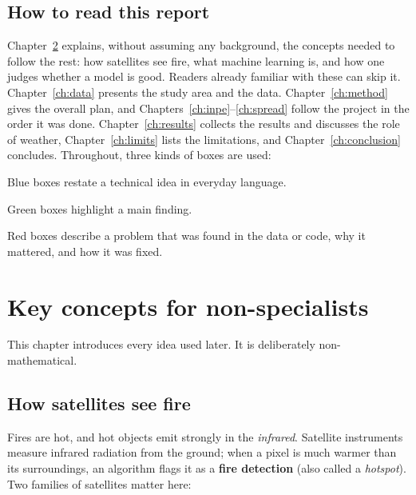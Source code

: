\documentclass[11pt,a4paper,oneside]{report}
\begin{document}
\section{How to read this report}

Chapter~\ref{ch:concepts} explains, without assuming any background, the
concepts needed to follow the rest: how satellites see fire, what machine
learning is, and how one judges whether a model is good. Readers already familiar
with these can skip it. Chapter~\ref{ch:data} presents the study area and the
data. Chapter~\ref{ch:method} gives the overall plan, and
Chapters~\ref{ch:inpe}--\ref{ch:spread} follow the project in the order it was
done. Chapter~\ref{ch:results} collects the results and discusses the role of
weather, Chapter~\ref{ch:limits} lists the limitations, and
Chapter~\ref{ch:conclusion} concludes. Throughout, three kinds of boxes are used:

\begin{plainbox}
Blue boxes restate a technical idea in everyday language.
\end{plainbox}
\begin{keybox}
Green boxes highlight a main finding.
\end{keybox}
\begin{warnbox}
Red boxes describe a problem that was found in the data or code, why it
mattered, and how it was fixed.
\end{warnbox}

\chapter{Key concepts for non-specialists}\label{ch:concepts}

This chapter introduces every idea used later. It is deliberately
non-mathematical.

\section{How satellites see fire}

Fires are hot, and hot objects emit strongly in the \emph{infrared}. Satellite
instruments measure infrared radiation from the ground; when a pixel is much
warmer than its surroundings, an algorithm flags it as a \textbf{fire detection}
(also called a \emph{hotspot}). Two families of satellites matter here:
\end{document}
